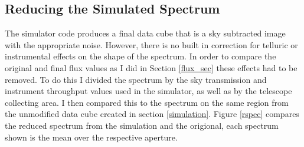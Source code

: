 \documentclass[11pt,twoside]{article}
\begin{document}
\subsection{Reducing the Simulated Spectrum}
The simulator code produces a final data cube that is a sky subtracted image with the appropriate noise. However, there is no built in correction for telluric or instrumental effects on the shape of the spectrum. In order to compare the original and final flux values as I did in Section \ref{flux_sec} these effects had to be removed. To do this I divided the spectrum by the sky transmission and instrument throughput values used in the simulator, as well as by the telescope collecting area. I then compared this to the spectrum on the same region from the unmodified data cube created in section \ref{simulation}. Figure \ref{rspec} compares the reduced spectrum from the simulation and the origional, each spectrum shown is the mean over the respective aperture.
\end{document}
